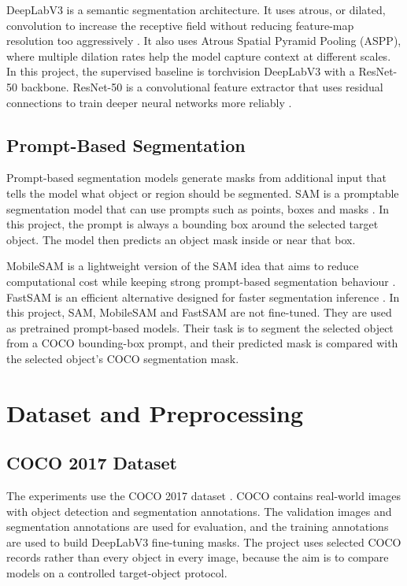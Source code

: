 \documentclass[9pt,a4paper,oneside]{rho-class/rho}
\begin{document}
    DeepLabV3 is a semantic segmentation architecture. It uses atrous, or dilated, convolution to increase the receptive field without reducing feature-map resolution too aggressively \cite{chen2017deeplabv3}. It also uses Atrous Spatial Pyramid Pooling (ASPP), where multiple dilation rates help the model capture context at different scales. In this project, the supervised baseline is torchvision DeepLabV3 with a ResNet-50 backbone. ResNet-50 is a convolutional feature extractor that uses residual connections to train deeper neural networks more reliably \cite{he2016resnet}.

\subsection{Prompt-Based Segmentation}

    Prompt-based segmentation models generate masks from additional input that tells the model what object or region should be segmented. SAM is a promptable segmentation model that can use prompts such as points, boxes and masks \cite{kirillov2023sam}. In this project, the prompt is always a bounding box around the selected target object. The model then predicts an object mask inside or near that box.

    MobileSAM is a lightweight version of the SAM idea that aims to reduce computational cost while keeping strong prompt-based segmentation behaviour \cite{zhang2023mobilesam}. FastSAM is an efficient alternative designed for faster segmentation inference \cite{zhao2023fastsam}. In this project, SAM, MobileSAM and FastSAM are not fine-tuned. They are used as pretrained prompt-based models. Their task is to segment the selected object from a COCO bounding-box prompt, and their predicted mask is compared with the selected object's COCO segmentation mask.

\section{Dataset and Preprocessing}

\subsection{COCO 2017 Dataset}

    The experiments use the COCO 2017 dataset \cite{lin2014coco}. COCO contains real-world images with object detection and segmentation annotations. The validation images and segmentation annotations are used for evaluation, and the training annotations are used to build DeepLabV3 fine-tuning masks. The project uses selected COCO records rather than every object in every image, because the aim is to compare models on a controlled target-object protocol.
\end{document}
